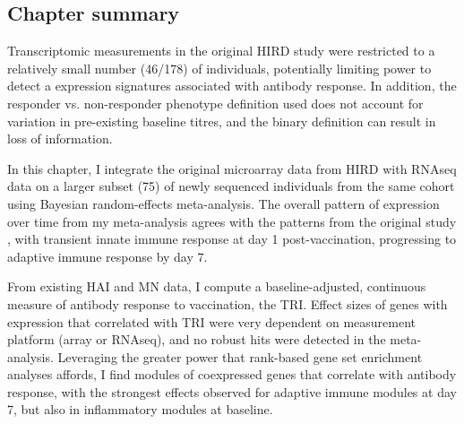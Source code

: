 \subsection{Chapter summary}


Transcriptomic measurements in the original \gls{HIRD} study were restricted to a relatively small number (46/178) of individuals, potentially limiting power to detect a expression signatures associated with antibody response.
In addition, the responder vs. non-responder phenotype definition used does not account for variation in pre-existing baseline titres, and the binary definition can result in loss of information\autocite{cohen1983CostDichotomization, senn2005DichotomaniaObsessiveCompulsive, fedorov2009ConsequencesDichotomization}.

In this chapter, I integrate the original microarray data from \gls{HIRD} with \gls{RNAseq} data on a larger subset (75) of newly sequenced individuals from the same cohort using Bayesian random-effects meta-analysis.
The overall pattern of expression over time from my meta-analysis agrees with the patterns from the original study \autocite{sobolev2016AdjuvantedInfluenzaH1N1Vaccination}, with transient innate immune response at day 1 post-vaccination, progressing to adaptive immune response by day 7.

From existing \gls{HAI} and \gls{MN} data, I compute a baseline-adjusted, continuous measure of antibody response to vaccination, the \gls{TRI}\autocite{bucasas2011EarlyPatternsGene}.
Effect sizes of genes with expression that correlated with \gls{TRI} were very dependent on measurement platform (array or \gls{RNAseq}), and no robust hits were detected in the meta-analysis.
Leveraging the greater power that rank-based gene set enrichment analyses affords, I find modules of coexpressed genes that correlate with antibody response, with the strongest effects observed for adaptive immune modules at day 7, but also in inflammatory modules at baseline.

